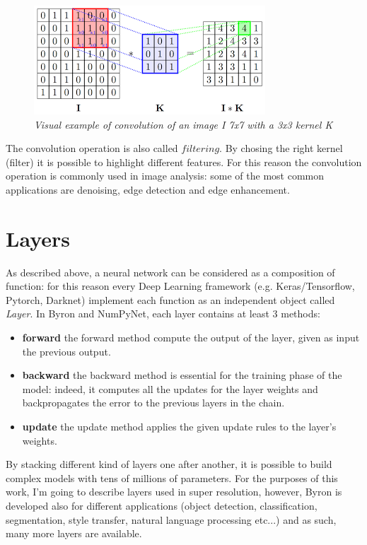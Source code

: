 \documentclass[12pt,a4paper]{report}
\begin{document}
\begin{figure}[h]
 \centering
 \includegraphics[scale=1.]{./images/conv.png}
 \caption{\it Visual example of convolution of an image I 7x7 with a 3x3 kernel K}
 \label{fig:convolution}
\end{figure}

The convolution operation is also called $filtering$. By chosing the right kernel (filter) it is possible to highlight different features. For this reason the convolution operation is commonly used in image analysis: some of the most common applications are denoising, edge detection and edge enhancement. 

\section{Layers}

As described above, a neural network can be considered as a composition of function: for this reason every Deep Learning framework (e.g. Keras/Tensorflow, Pytorch, Darknet) implement each function as an independent object called {\it Layer}. In Byron and NumPyNet, each layer contains at least 3 methods:
\begin{itemize}
 \setlength\itemsep{-0.3em}
 \item {\bf forward} the forward method compute the output of the layer, given as input the previous output. 
 \item {\bf backward} the backward method is essential for the training phase of the model: indeed, it computes all the updates for the layer weights and backpropagates the error to the previous layers in the chain.
 \item {\bf update} the update method applies the given update rules to the layer's weights.
\end{itemize}
By stacking different kind of layers one after another, it is possible to build 
complex models with tens of millions of parameters. 
For the purposes of this work, I'm going to describe layers used in super resolution, however, Byron is developed also for different applications (object detection, classification, segmentation, style transfer, natural language processing etc...) and as such, many more layers are available.   
\end{document}
